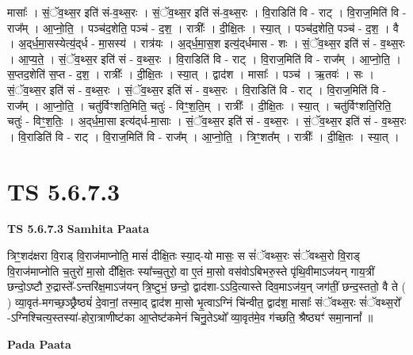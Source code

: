\documentclass[17pt]{extarticle}
\begin{document}
मासाः᳚ । सं॒ॅव॒थ्स॒र इति॑ सं-व॒थ्स॒रः । सं॒ॅव॒थ्स॒र इति॑ सं-व॒थ्स॒रः । वि॒राडिति॑ वि -   राट् । वि॒राज॒मिति॑ वि - राज᳚म् । आ॒प्नो॒ति॒ । पञ्च॑द॒शेति॒ पञ्च॑ - द॒श॒ । रात्रीः᳚ । दी॒क्षि॒तः । स्या॒त् । पञ्च॑द॒शेति॒ पञ्च॑ - द॒श॒ । वै । अ॒द्‌र्ध॒मा॒सस्येत्य॒॑द्‌र्ध - मा॒सस्य॑ ।   रात्र॑यः । अ॒द्‌र्ध॒मा॒स॒श इत्य॒॑द्‌र्धमास -   शः । सं॒ॅव॒थ्स॒र इति॑ सं - व॒थ्स॒रः । आ॒प्य॒ते॒ । सं॒ॅव॒थ्स॒र इति॑ सं - व॒थ्स॒रः । वि॒राडिति॑ वि - राट् । वि॒राज॒मिति॑ वि - राज᳚म् । आ॒प्नो॒ति॒ । स॒प्तद॒शेति॑ स॒प्त - द॒श॒ । रात्रीः᳚ । दी॒क्षि॒तः । स्या॒त् । द्वाद॑श । मासाः᳚ । पञ्च॑ । ऋ॒तवः॑ । सः । सं॒ॅव॒थ्स॒र इति॑ सं - व॒थ्स॒रः । सं॒ॅव॒थ्स॒र इति॑ सं - व॒थ्स॒रः । वि॒राडिति॑ वि - राट् । वि॒राज॒मिति॑ वि - राज᳚म् । आ॒प्नो॒ति॒ । चतु॑र्विꣳशति॒मिति॒ चतुः॑ - विꣳ॒॒श॒ति॒म् । रात्रीः᳚ । दी॒क्षि॒तः । स्या॒त् । चतु॑र्विꣳशति॒रिति॒ चतुः॑ - विꣳ॒॒श॒तिः॒ । अ॒द्‌र्ध॒मा॒सा इत्य॑द्‌र्ध-मा॒साः । सं॒ॅव॒थ्स॒र इति॑ सं - व॒थ्स॒रः । सं॒ॅव॒थ्स॒र इति॑ सं - व॒थ्स॒रः । वि॒राडिति॑ वि - राट् । वि॒राज॒मिति॑ वि - राज᳚म् । आ॒प्नो॒ति॒ । त्रिꣳ॒॒शत᳚म् । रात्रीः᳚ । दी॒क्षि॒तः । स्या॒त् ।  \newline




\section*{ TS 5.6.7.3 }

\textbf{TS 5.6.7.3 } \newline
\textbf{Samhita Paata} \newline

त्रिꣳ॒॒शद॑क्षरा वि॒राड् वि॒राज॑माप्नोति॒ मासं॑ दीक्षि॒तः स्या॒द्-यो मासः॒ स सं॑ॅवथ्स॒रः सं॑ॅवथ्स॒रो वि॒राड् वि॒राज॑माप्नोति च॒तुरो॑ मा॒सो दी᳚क्षि॒तः स्या᳚च्च॒तुरो॒ वा ए॒तं मा॒सो वस॑वोऽबिभरु॒स्ते पृ॑थि॒वीमाऽज॑यन् गाय॒त्रीं छन्दो॒ऽष्टौ रु॒द्रास्ते᳚-ऽन्तरि॑क्ष॒माऽज॑यन् त्रि॒ष्टुभं॒ छन्दो॒ द्वाद॑शा-ऽऽदि॒त्यास्ते दिव॒माऽज॑य॒न् जग॑तीं॒ छन्द॒स्ततो॒ वै ते ( ) व्या॒वृत॑-मगच्छ॒ञ्छ्रैष्ठ्यं॑ दे॒वानां॒ तस्मा॒द् द्वाद॑श मा॒सो भृ॒त्वाऽग्निं चि॑न्वीत॒ द्वाद॑श॒ मासाः᳚ संॅवथ्स॒रः सं॑ॅवथ्स॒रो᳚ -ऽग्निश्चित्य॒स्तस्या॑-होरा॒त्राणीष्ट॑का आ॒प्तेष्ट॑कमेनं चिनु॒तेऽथो᳚ व्या॒वृत॑मे॒व ग॑च्छति॒ श्रैष्ठ्यꣳ॑ समा॒नानां᳚ ॥ \newline

\textbf{Pada Paata} \newline
\end{document}
